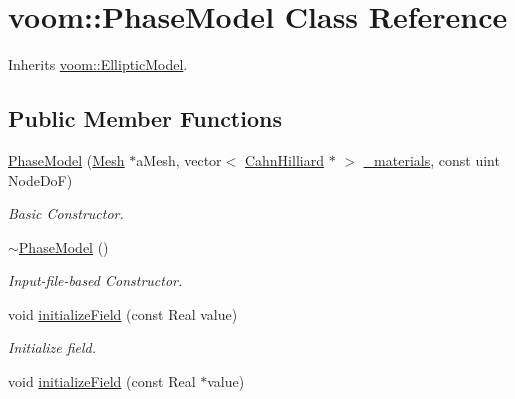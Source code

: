 \hypertarget{classvoom_1_1_phase_model}{
\section{voom::PhaseModel Class Reference}
\label{classvoom_1_1_phase_model}
}


Inherits \hyperlink{classvoom_1_1_elliptic_model}{voom::EllipticModel}.\subsection*{Public Member Functions}
\begin{DoxyCompactItemize}
\item 
\hyperlink{classvoom_1_1_phase_model_a8cd3d41eb76b5e4f14b7f79fb546ba10}{PhaseModel} (\hyperlink{classvoom_1_1_mesh}{Mesh} $\ast$aMesh, vector$<$ \hyperlink{classvoom_1_1_cahn_hilliard}{CahnHilliard} $\ast$ $>$ \hyperlink{classvoom_1_1_phase_model_a4c98ae066d83a04ab5c7f01f82ba8b52}{\_\-materials}, const uint NodeDoF)
\begin{DoxyCompactList}\small\item\em Basic Constructor. \item\end{DoxyCompactList}\item 
\hyperlink{classvoom_1_1_phase_model_abf7ed3a23d7d1d2d36ecd84d847410e8}{$\sim$PhaseModel} ()
\begin{DoxyCompactList}\small\item\em Input-\/file-\/based Constructor. \item\end{DoxyCompactList}\item 
\hypertarget{classvoom_1_1_phase_model_ae4084325f83816212aa2bc98b5f62fb8}{
void \hyperlink{classvoom_1_1_phase_model_ae4084325f83816212aa2bc98b5f62fb8}{initializeField} (const Real value)}
\label{classvoom_1_1_phase_model_ae4084325f83816212aa2bc98b5f62fb8}

\begin{DoxyCompactList}\small\item\em Initialize field. \item\end{DoxyCompactList}\item 
\hypertarget{classvoom_1_1_phase_model_a534b674f91325c98385a2bf9294bc45a}{
void \hyperlink{classvoom_1_1_phase_model_a534b674f91325c98385a2bf9294bc45a}{initializeField} (const Real $\ast$value)}
\label{classvoom_1_1_phase_model_a534b674f91325c98385a2bf9294bc45a}


\end{DoxyCompactItemize}
